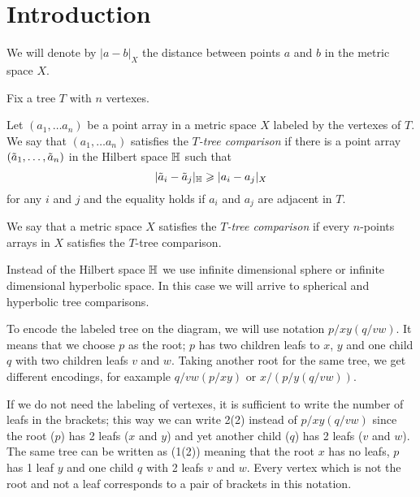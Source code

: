 \section{Introduction}\label{sec:intro}

We will denote by $|a-b|_X$ the distance between points $a$ and $b$ in the metric space $X$.

Fix a tree $T$ with $n$ vertexes.

Let $(a_1,\dots a_n)$ be a point array in a metric space $X$ labeled by the vertexes of $T$.
We say that $(a_1,\dots a_n)$  satisfies the \emph{$T$-tree comparison} if there is a point array $(\~a_1,\dots, \~a_n)$ in the Hilbert space $\HH$ such that 
\[|\~a_i-\~a_j|_\HH\ge|a_i-a_j|_X\]
for any $i$ and $j$ and the equality holds if $a_i$ and $a_j$ are adjacent in $T$.

We say that a metric space $X$ satisfies the \emph{$T$-tree comparison} if 
every $n$-points arrays in $X$ satisfies the $T$-tree comparison.

Instead of the Hilbert space $\HH$ we use infinite dimensional sphere or infinite dimensional hyperbolic space.
In this case we will arrive to spherical and hyperbolic tree comparisons.

\hide
\begin{wrapfigure}{r}{27 mm}
\end{wrapfigure}
\unhide

To encode the labeled tree on the diagram, we will use notation $p/xy(q/vw)$.
It means that we choose $p$ as the root; 
$p$ has two children leafs to $x$, $y$ and one child $q$ with two children leafs $v$ and $w$.
Taking another root for the same tree, we get different encodings, for eaxample $q/vw(p/xy)$ or $x/(p/y(q/vw))$.

If we do not need the labeling of vertexes,
it is sufficient to write the number of leafs in the brackets;
this way we can write 2(2) instead of $p/xy(q/vw)$ since the root ($p$) has 2 leafs ($x$ and $y$) and yet another child ($q$) has 2 leafs ($v$ and $w$).  
The same tree can be written as (1(2)) meaning that the root $x$ has no leafs, 
$p$ has 1 leaf $y$ and one child $q$ with 2 leafs $v$ and $w$.
Every vertex which is not the root and not a leaf corresponds to a pair of brackets in this notation.

